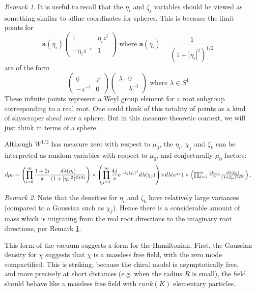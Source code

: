 \documentclass{amsart}
\theoremstyle{conjecture}
\theoremstyle{definition}
\theoremstyle{question}
\theoremstyle{questions}
\theoremstyle{remark}
\newtheorem*{remark}{Remark}
\theoremstyle{remarks}
\theoremstyle{example}
\numberwithin{equation}{section}
\begin{document}
\begin{remark}\label{leaking} It is useful to recall that the $\eta_i$ and $\zeta_j$ variables should be viewed as
something similar to affine coordinates for spheres. This is because the limit points for
$$\mathbf a(\eta_i)\left(\begin{matrix} 1&\overline{\eta}_iz^i\\
-\eta_iz^{-i}&1\end{matrix} \right) \text{  where  } \mathbf a(\eta_i)=\frac{1}{(1+|\eta_i|^2)^{1/2}} $$
are of the form
$$\left(\begin{matrix} 0&z^i\\
-z^{-i}&0\end{matrix} \right)\left(\begin{matrix} \lambda&0\\
&\lambda^{-1}\end{matrix} \right)  \text{  where  } \lambda\in S^1$$
These infinite points represent a Weyl group element for a root subgroup corresponding to a real root. One could think of this totality of points as a kind of skyscraper sheaf over a sphere. But in this measure theoretic context, we will just think in terms of a sphere.
\end{remark}


Although $W^{1/2}$ has measure zero with respect to $\mu_0$, the $\eta_i$, $\chi_j$ and $\zeta_k$
can be interpreted as random variables with respect to $\mu_0$, and conjecturally
$\mu_0$ factors:
\begin{equation}\label{productmeasure7}d\mu_0=\left(\prod_{i=0}^{\infty}\frac {1+2i}{\pi}\frac
{d\lambda (\eta_
i)}{(1+\vert\eta_i\vert^2)^{2+2i}}\right)\times \left(\prod_{
j=1}^{\infty}\frac
{4j}{\pi}e^{-4j\vert\mathbf{\chi}_j\vert^2}d\lambda
(\mathbf{\chi}_j)\right)$$
$$\times d\lambda
(e^{\chi_0})\times\left(\prod_{k=1}^{\infty}\frac
{2k-1}{\pi}\frac {d\lambda (\zeta_
k)}{(1+\vert\zeta_k\vert^2)^{2k}}\right),\end{equation}

\begin{remark}\label{leaking2} Note that the densities for $\eta_i$ and $\zeta_k$ have relatively large variances (compared to a Gaussian such as $\chi_j$). Hence there is a considerable amount of mass which is migrating from the real root directions to the imaginary root directions, per Remark \ref{leaking}.
\end{remark}


This form of the vacuum suggests a form for the Hamiltonian. First, the Gaussian density for $\chi$ suggests that $\chi$ is a massless free field, with the zero mode compactified. 
This is striking, because the chiral model is asymptotically free, and more precisely at short distances (e.g. when the radius $R$ is small), the field should behave like a massless free field with $rank(K)$ elementary particles.
\end{document}
